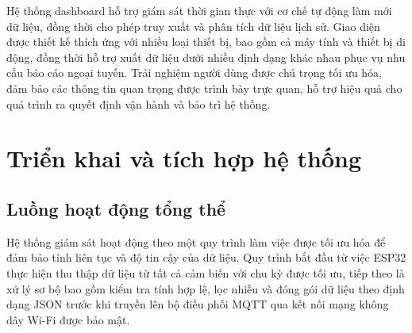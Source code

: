 \documentclass[../main.tex]{subfiles}
\begin{document}
Hệ thống dashboard hỗ trợ giám sát thời gian thực với cơ chế tự động làm mới dữ liệu, đồng thời cho phép truy xuất và phân tích dữ liệu lịch sử. Giao diện được thiết kế thích ứng với nhiều loại thiết bị, bao gồm cả máy tính và thiết bị di động, đồng thời hỗ trợ xuất dữ liệu dưới nhiều định dạng khác nhau phục vụ nhu cầu báo cáo ngoại tuyến. Trải nghiệm người dùng được chú trọng tối ưu hóa, đảm bảo các thông tin quan trọng được trình bày trực quan, hỗ trợ hiệu quả cho quá trình ra quyết định vận hành và bảo trì hệ thống.

\section{Triển khai và tích hợp hệ thống}
\label{sec:system_implementation}

\subsection{Luồng hoạt động tổng thể}
\label{sec:system_workflow}

Hệ thống giám sát hoạt động theo một quy trình làm việc được tối ưu hóa để đảm bảo tính liên tục và độ tin cậy của dữ liệu. Quy trình bắt đầu từ việc ESP32 thực hiện thu thập dữ liệu từ tất cả cảm biến với chu kỳ được tối ưu, tiếp theo là xử lý sơ bộ bao gồm kiểm tra tính hợp lệ, lọc nhiễu và đóng gói dữ liệu theo định dạng JSON trước khi truyền lên bộ điều phối MQTT qua kết nối mạng không dây Wi-Fi được bảo mật.
\end{document}
